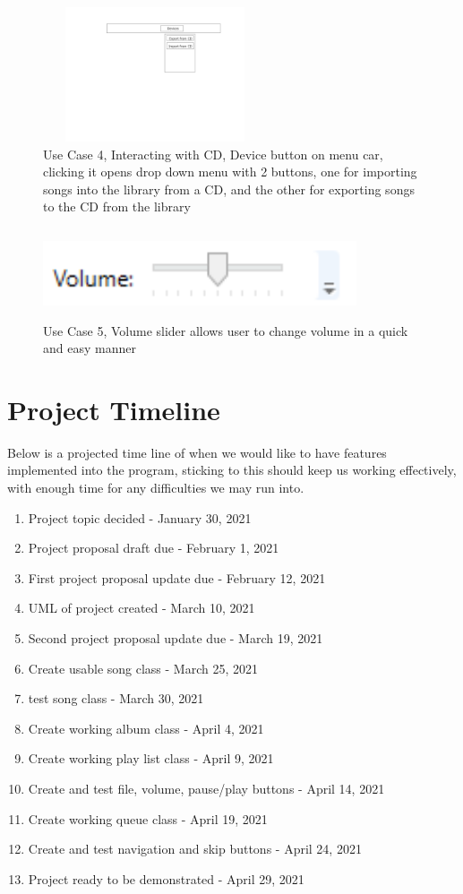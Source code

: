 \documentclass[10pt,conference,onecolumn,compsoc]{IEEEtran}
\begin{document}
\begin{figure}
\includegraphics[height=150px, width=250px]{Play_CD_Mock_Up.jpg}
\caption{Use Case 4, Interacting with CD, Device button on menu car, clicking it opens drop down menu with 2 buttons, one for importing songs into the library from a CD, and the other for exporting songs to the CD from the library}
\label{PlayCD}
\end{figure}

\begin{figure}
\includegraphics[height=100px, width=350px]{Volume_Slider.png}
\caption{Use Case 5, Volume slider allows user to change volume in a quick and easy manner}
\label{VolumeButton}
\end{figure}

\section{Project Timeline}
Below is a projected time line of when we would like to have features implemented into the program, sticking to this should keep us working effectively, with enough time for any difficulties we may run into.

\begin{enumerate}
\item Project topic decided - January 30, 2021
\item Project proposal draft due - February 1, 2021
\item First project proposal update due - February 12, 2021
\item UML of project created - March 10, 2021
\item Second project proposal update due - March 19, 2021
\item Create usable song class - March 25, 2021
\item test song class - March 30, 2021
\item Create working album class - April 4, 2021
\item Create working play list class - April 9, 2021
\item Create and test file, volume, pause/play buttons - April 14, 2021
\item Create working queue class - April 19, 2021
\item Create and test navigation and skip buttons - April 24, 2021
\item Project ready to be demonstrated - April 29, 2021
\end{enumerate}
\end{document}
